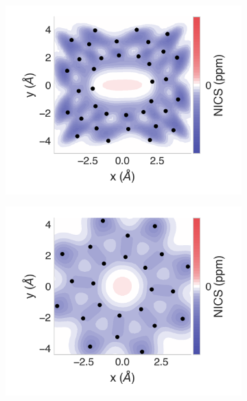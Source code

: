 \documentclass[
	fontsize=10pt, %
	twoside=true, %
	numbers=noenddot, %
]{kaobook}
\begin{document}
\begin{figure}[h]
\begin{subfigure}{5.5cm}\centering\includegraphics{s12-2d}\end{subfigure}
\begin{subfigure}{5.5cm}\centering\includegraphics{se08-2d}\end{subfigure}%

\end{figure}
\end{document}
